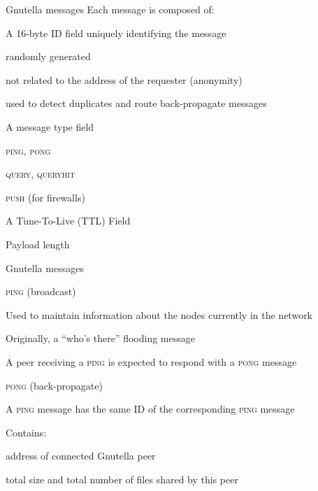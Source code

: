 \begin{frame}{Gnutella messages}
Each message is composed of:
\BIL
\item A 16-byte ID field uniquely identifying the message
	\BI
	\item randomly generated
	\item not related to the address of the requester (anonymity)
	\item used to detect duplicates and route back-propagate messages
	\EI
\item A message type field
	\BI
	\item \textsc{ping}, \textsc{pong}
	\item \textsc{query}, \textsc{queryhit}
	\item \textsc{push} (for firewalls)
	\EI
\item A Time-To-Live (TTL) Field
\item Payload length
\EIL

\end{frame}

\begin{frame}{Gnutella messages}

\BIL
\item \alert{\textsc{ping}} (broadcast)
	\BI
	\item Used to maintain information about the nodes currently in the network
	\item Originally, a “who's there” flooding message
	\item A peer receiving a \textsc{ping} is expected to respond with a \textsc{pong} message
	\EI
\item \alert{\textsc{pong}} (back-propagate)
	\BI
	\item A \textsc{ping} message has the same ID of the corresponding \textsc{ping} message
	\item Contains:
		\BI
		\item address of connected Gnutella peer
		\item total size and total number of files shared by this peer
		\EI
	\EI
\EIL
\end{frame}


